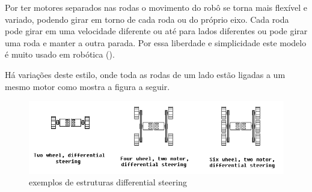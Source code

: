 Por ter motores separados nas rodas o movimento do robô se torna mais flexível e variado, podendo girar em torno de cada roda ou do próprio eixo. Cada roda pode girar em uma velocidade diferente ou até para lados diferentes ou pode girar uma roda e manter a outra parada. Por essa liberdade e simplicidade este modelo é muito usado em robótica (\cite{Mataric2007}).

Há variações deste estilo, onde toda as rodas de um lado estão ligadas a um mesmo motor como mostra a figura a seguir.

\begin{figure}[h]
	\centering
	\label{fig17}
		\includegraphics[keepaspectratio=true,scale=0.7]{figuras/3differentialSteering.png}
	\caption{exemplos de estruturas differential steering \cite{IMG_DIFFERENTIAL_STEERING_SITE}}
\end{figure}
